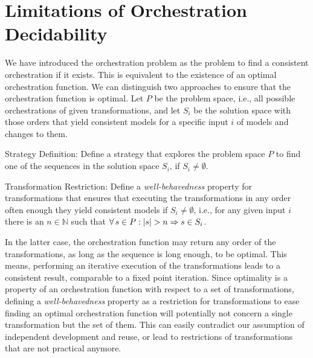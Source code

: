 \section{Limitations of Orchestration Decidability}
\label{chap:orchestration:decidability}

We have introduced the orchestration problem as the problem to find a consistent orchestration if it exists.
This is equivalent to the existence of an optimal orchestration function.
We can distinguish two approaches to ensure that the orchestration function is optimal. %
Let $P$ be the problem space, i.e., all possible orchestrations of given transformations, and let $S_{i}$ be the solution space with those orders that yield consistent models for a specific input $i$ of models and changes to them.
\begin{properdescription}
    \item[Strategy Definition:] Define a strategy that explores the problem space $P$ to find one of the sequences in the solution space $S_{i}$, if $S_{i} \neq \emptyset$.
    \item[Transformation Restriction:] Define a \emph{well-behavedness} property for transformations that ensures that executing the transformations in any order often enough they yield consistent models if $S_{i} \neq \emptyset$, i.e., for any given input $i$ there is an $n \in \mathbb{N}$ such that $\forall s \in P : \abs{s} > n \Rightarrow s \in S_{i}$.
\end{properdescription}


In the latter case, the orchestration function may return any order of the transformations, as long as the sequence is long enough, to be optimal.
This means, performing an iterative execution of the transformations leads to a consistent result, comparable to a fixed point iteration.
Since optimality is a property of an orchestration function with respect to a set of transformations, defining a \emph{well-behavedness} property as a restriction for transformations to ease finding an optimal orchestration function will potentially not concern a single transformation but the set of them.
This can easily contradict our assumption of independent development and reuse, or lead to restrictions of transformations that are not practical anymore.

